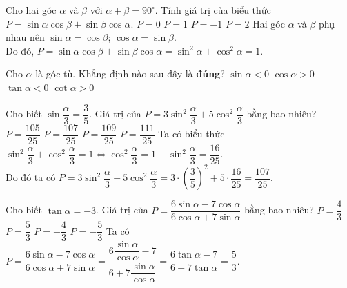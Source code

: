 \begin{ex}%
	Cho hai góc $\alpha $ và $\beta $ với $\alpha +\beta =90^\circ $. Tính giá trị của biểu thức  $P=\sin \alpha \cos \beta +\sin \beta \cos \alpha $.
	\choice
	{$P=0$}
	{\True $P=1$}
	{$P=-1$}
	{$P=2$}
	\loigiai
	{Hai góc $\alpha $ và $\beta $ phụ nhau nên $\sin \alpha =\cos \beta$; $\cos \alpha =\sin \beta $.\\
		Do đó, $P=\sin \alpha \cos \beta +\sin \beta \cos \alpha =\sin ^2\alpha +\cos^2\alpha =1$.}
\end{ex}

\begin{ex}%
	Cho $\alpha $ là góc tù. Khẳng định nào sau đây là \textbf{đúng}?
	\choice
	{$\sin \alpha <0$}
	{$\cos \alpha >0$}
	{\True $\tan \alpha <0$}
	{$\cot \alpha >0$} 
	\loigiai{}
\end{ex}

\begin{ex}%
	Cho biết $\sin \dfrac{\alpha }{3}=\dfrac{3}{5}$. Giá trị của $P=3\sin ^2\dfrac{\alpha }{3}+5\cos^2\dfrac{\alpha }{3}$ bằng bao nhiêu?
	\choice
	{$P=\dfrac{105}{25}$}
	{\True $P=\dfrac{107}{25}$}
	{$P=\dfrac{109}{25}$}
	{$P=\dfrac{111}{25}$}
	\loigiai
	{Ta có biểu thức $\sin ^2\dfrac{\alpha }{3}+\cos^2\dfrac{\alpha }{3}=1\Leftrightarrow \cos^2\dfrac{\alpha }{3}=1-\sin ^2\dfrac{\alpha }{3}=\dfrac{16}{25}$.\\
		Do đó ta có $P=3\sin ^2\dfrac{\alpha }{3}+5\cos^2\dfrac{\alpha }{3}=3\cdot {(\dfrac{3}{5} )}^2+5\cdot \dfrac{16}{25}=\dfrac{107}{25}$.}
\end{ex}
\begin{ex}%
	Cho biết $\tan \alpha =-3$. Giá trị của $P=\dfrac{6\sin \alpha -7\cos \alpha }{6\cos \alpha +7\sin \alpha }$ bằng bao nhiêu?
	\choice
	{$P=\dfrac{4}{3}$}
	{\True $P=\dfrac{5}{3}$}
	{$P=-\dfrac{4}{3}$}
	{$P=-\dfrac{5}{3}$}
	\loigiai
	{Ta có $P=\dfrac{6\sin \alpha -7\cos \alpha }{6\cos \alpha +7\sin \alpha }=\dfrac{6\dfrac{\sin \alpha }{\cos \alpha }-7}{6+7\dfrac{\sin \alpha }{\cos \alpha }}=\dfrac{6\tan \alpha -7}{6+7\tan \alpha }=\dfrac{5}{3}$.}
\end{ex}

